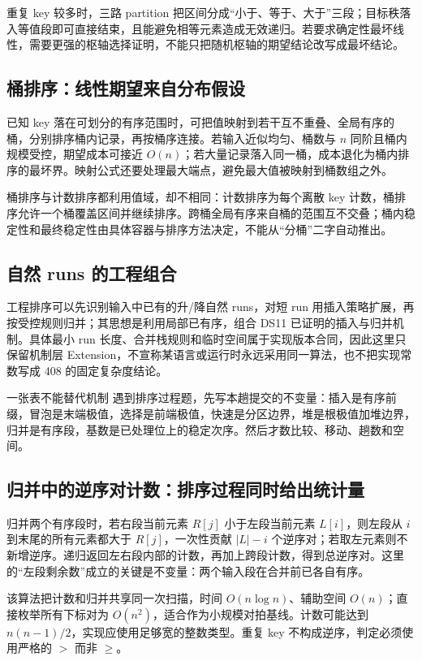 \documentclass[UTF8,fontset=none,11pt,a4paper]{ctexart}
\begin{document}
重复 key 较多时，三路 partition 把区间分成“小于、等于、大于”三段；目标秩落入等值段即可直接结束，且能避免相等元素造成无效递归。若要求确定性最坏线性，需要更强的枢轴选择证明，不能只把随机枢轴的期望结论改写成最坏结论。

\subsection{桶排序：线性期望来自分布假设}
已知 key 落在可划分的有序范围时，可把值映射到若干互不重叠、全局有序的桶，分别排序桶内记录，再按桶序连接。若输入近似均匀、桶数与 $n$ 同阶且桶内规模受控，期望成本可接近 $O(n)$；若大量记录落入同一桶，成本退化为桶内排序的最坏界。映射公式还要处理最大端点，避免最大值被映射到桶数组之外。

桶排序与计数排序都利用值域，却不相同：计数排序为每个离散 key 计数，桶排序允许一个桶覆盖区间并继续排序。跨桶全局有序来自桶的范围互不交叠；桶内稳定性和最终稳定性由具体容器与排序方法决定，不能从“分桶”二字自动推出。

\subsection{自然 runs 的工程组合}
工程排序可以先识别输入中已有的升/降自然 runs，对短 run 用插入策略扩展，再按受控规则归并；其思想是利用局部已有序，组合 DS11 已证明的插入与归并机制。具体最小 run 长度、合并栈规则和临时空间属于实现版本合同，因此这里只保留机制层 Extension，不宣称某语言或运行时永远采用同一算法，也不把实现常数写成 408 的固定复杂度结论。

\begin{methodbox}{一张表不能替代机制}
遇到排序过程题，先写本趟提交的不变量：插入是有序前缀，冒泡是末端极值，选择是前端极值，快速是分区边界，堆是根极值加堆边界，归并是有序段，基数是已处理位上的稳定次序。然后才数比较、移动、趟数和空间。
\end{methodbox}

\subsection{归并中的逆序对计数：排序过程同时给出统计量}
归并两个有序段时，若右段当前元素 $R[j]$ 小于左段当前元素 $L[i]$，则左段从 $i$ 到末尾的所有元素都大于 $R[j]$，一次性贡献 $|L|-i$ 个逆序对；若取左元素则不新增逆序。递归返回左右段内部的计数，再加上跨段计数，得到总逆序对。这里的“左段剩余数”成立的关键是不变量：两个输入段在合并前已各自有序。

该算法把计数和归并共享同一次扫描，时间 $O(n\log n)$、辅助空间 $O(n)$；直接枚举所有下标对为 $O(n^2)$，适合作为小规模对拍基线。计数可能达到 $n(n-1)/2$，实现应使用足够宽的整数类型。重复 key 不构成逆序，判定必须使用严格的 $>$ 而非 $\ge$。
\end{document}
